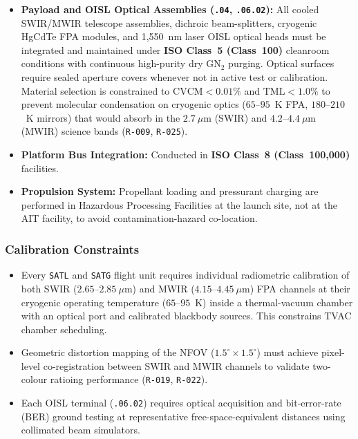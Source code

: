 \begin{itemize}
    \item \textbf{Payload and OISL Optical Assemblies (\texttt{.04}, \texttt{.06.02}):} All cooled SWIR/MWIR telescope assemblies, dichroic beam-splitters, cryogenic HgCdTe FPA modules, and 1,550~nm laser OISL optical heads must be integrated and maintained under \textbf{ISO Class~5 (Class~100)} cleanroom conditions with continuous high-purity dry $\mathrm{GN_2}$ purging. Optical surfaces require sealed aperture covers whenever not in active test or calibration. Material selection is constrained to $\mathrm{CVCM} < 0.01\%$ and $\mathrm{TML} < 1.0\%$ to prevent molecular condensation on cryogenic optics ($65$--$95$~K FPA, $180$--$210$~K mirrors) that would absorb in the $2.7~\mu\mathrm{m}$ (SWIR) and $4.2$--$4.4~\mu\mathrm{m}$ (MWIR) science bands (\texttt{R-009}, \texttt{R-025}).
    \item \textbf{Platform Bus Integration:} Conducted in \textbf{ISO Class~8 (Class~100,000)} facilities.
    \item \textbf{Propulsion System:} Propellant loading and pressurant charging are performed in Hazardous Processing Facilities at the launch site, not at the AIT facility, to avoid contamination-hazard co-location.
\end{itemize}

\subsubsection{Calibration Constraints}

\begin{itemize}
    \item Every \texttt{SATL} and \texttt{SATG} flight unit requires individual radiometric calibration of both SWIR ($2.65$--$2.85~\mu\mathrm{m}$) and MWIR ($4.15$--$4.45~\mu\mathrm{m}$) FPA channels at their cryogenic operating temperature ($65$--$95$~K) inside a thermal-vacuum chamber with an optical port and calibrated blackbody sources. This constrains TVAC chamber scheduling.
    \item Geometric distortion mapping of the NFOV ($1.5^\circ \times 1.5^\circ$) must achieve pixel-level co-registration between SWIR and MWIR channels to validate two-colour ratioing performance (\texttt{R-019}, \texttt{R-022}).
    \item Each OISL terminal (\texttt{.06.02}) requires optical acquisition and bit-error-rate (BER) ground testing at representative free-space-equivalent distances using collimated beam simulators.
\end{itemize}

